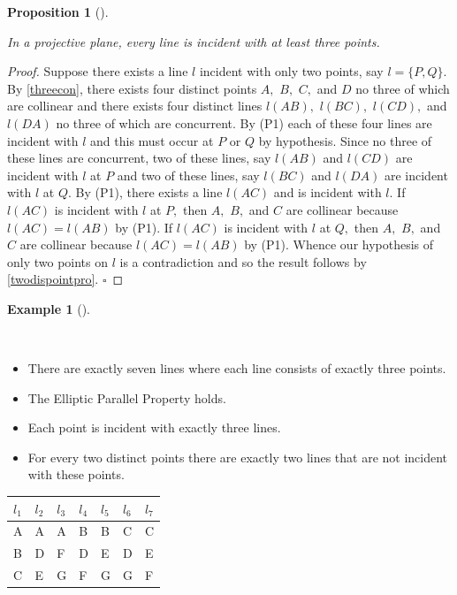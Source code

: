 \documentclass[
  twoside,
  12pt,
  letterpaper,
  fleqn]{article}
\providecommand{\tightlist}{%
  \setlength{\itemsep}{0pt}\setlength{\parskip}{0pt}}\usepackage{longtable,booktabs,array}
\theoremstyle{definition}
\theoremstyle{definition}
\newtheorem{example}{Example}[section]
\theoremstyle{plain}
\newtheorem{proposition}{Proposition}[section]
\theoremstyle{plain}
\theoremstyle{remark}
\begin{document}
\begin{proposition}[]\protect\hypertarget{prp-threepoints}{}\label{prp-threepoints}

In a projective plane, every line is incident with at least three
points.

\end{proposition}

\begin{proof}

Suppose there exists a line \(l\) incident with only two points, say
\(l=\{P,Q\}.\) By \eqref{threecon}, there exists four distinct points
\(A,\) \(B,\) \(C,\) and \(D\) no three of which are collinear and there
exists four distinct lines \(l(AB),\) \(l(BC),\) \(l(CD),\) and
\(l(DA)\) no three of which are concurrent. By (P1) each of these four
lines are incident with \(l\) and this must occur at \(P\) or \(Q\) by
hypothesis. Since no three of these lines are concurrent, two of these
lines, say \(l(AB)\) and \(l(CD)\) are incident with \(l\) at \(P\) and
two of these lines, say \(l(BC)\) and \(l(DA)\) are incident with \(l\)
at \(Q.\) By (P1), there exists a line \(l(AC)\) and is incident with
\(l.\) If \(l(AC)\) is incident with \(l\) at \(P,\) then \(A,\) \(B,\)
and \(C\) are collinear because \(l(AC)=l(AB)\) by (P1). If \(l(AC)\) is
incident with \(l\) at \(Q,\) then \(A,\) \(B,\) and \(C\) are collinear
because \(l(AC)=l(AB)\) by (P1). Whence our hypothesis of only two
points on \(l\) is a contradiction and so the result follows by
\eqref{twodispointpro}. \(\square\)

\end{proof}

\begin{example}[]\protect\hypertarget{exm-fanoplane}{}\label{exm-fanoplane}

~

\begin{itemize}
\tightlist
\item
  There are exactly seven lines where each line consists of exactly
  three points.
\item
  The Elliptic Parallel Property holds.
\item
  Each point is incident with exactly three lines.
\item
  For every two distinct points there are exactly two lines that are not
  incident with these points.
\end{itemize}

\begin{longtable}[]{@{}lllllll@{}}
\toprule()
\(l_1\) & \(l_2\) & \(l_3\) & \(l_4\) & \(l_5\) & \(l_6\) & \(l_7\) \\
\midrule()
\endhead
A & A & A & B & B & C & C \\
B & D & F & D & E & D & E \\
C & E & G & F & G & G & F \\
\bottomrule()
\end{longtable}

\end{example}
\end{document}
